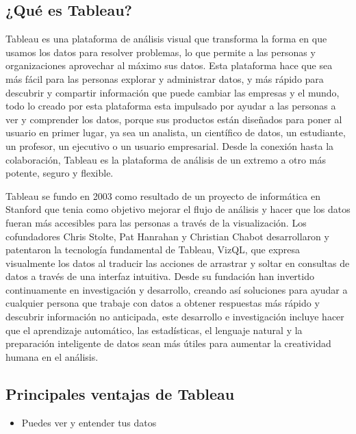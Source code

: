 \documentclass[
]{book}
\providecommand{\tightlist}{%
  \setlength{\itemsep}{0pt}\setlength{\parskip}{0pt}}
\begin{document}
\hypertarget{quuxe9-es-tableau}{%
\subsection{¿Qué es Tableau?}\label{quuxe9-es-tableau}}

Tableau es una plataforma de análisis visual que transforma la forma en que usamos los datos para resolver problemas, lo que permite a las personas y organizaciones aprovechar al máximo sus datos. Esta plataforma hace que sea más fácil para las personas explorar y administrar datos, y más rápido para descubrir y compartir información que puede cambiar las empresas y el mundo, todo lo creado por esta plataforma esta impulsado por ayudar a las personas a ver y comprender los datos, porque sus productos están diseñados para poner al usuario en primer lugar, ya sea un analista, un científico de datos, un estudiante, un profesor, un ejecutivo o un usuario empresarial. Desde la conexión hasta la colaboración, Tableau es la plataforma de análisis de un extremo a otro más potente, seguro y flexible.

Tableau se fundo en 2003 como resultado de un proyecto de informática en Stanford que tenia como objetivo mejorar el flujo de análisis y hacer que los datos fueran más accesibles para las personas a través de la visualización. Los cofundadores Chris Stolte, Pat Hanrahan y Christian Chabot desarrollaron y patentaron la tecnología fundamental de Tableau, VizQL, que expresa visualmente los datos al traducir las acciones de arrastrar y soltar en consultas de datos a través de una interfaz intuitiva. Desde su fundación han invertido continuamente en investigación y desarrollo, creando así soluciones para ayudar a cualquier persona que trabaje con datos a obtener respuestas más rápido y descubrir información no anticipada, este desarrollo e investigación incluye hacer que el aprendizaje automático, las estadísticas, el lenguaje natural y la preparación inteligente de datos sean más útiles para aumentar la creatividad humana en el análisis.

\hypertarget{principales-ventajas-de-tableau}{%
\subsection{Principales ventajas de Tableau}\label{principales-ventajas-de-tableau}}

\begin{itemize}
\tightlist
\item
  Puedes ver y entender tus datos
\end{itemize}
\end{document}
